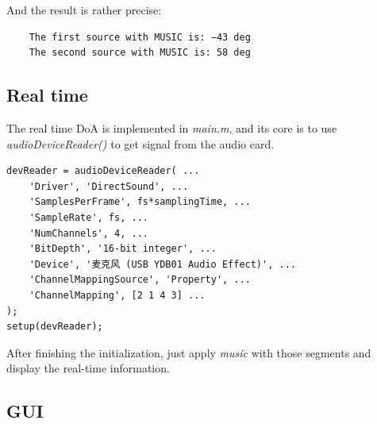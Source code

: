 \documentclass[UTF8]{article}
\begin{document}
\begin{figure}[H]
    \centering
    \hspace{0.4in}
\end{figure}

And the result is rather precise:
\begin{lstlisting}
    The first source with MUSIC is: −43 deg
    The second source with MUSIC is: 58 deg
\end{lstlisting}

\subsection{Real time}
The real time DoA is implemented in \emph{main.m}, and its core is to use \emph{audioDeviceReader()} to get signal from the audio card.

\begin{lstlisting}
devReader = audioDeviceReader( ...
    'Driver', 'DirectSound', ...
    'SamplesPerFrame', fs*samplingTime, ...
    'SampleRate', fs, ...
    'NumChannels', 4, ...
    'BitDepth', '16-bit integer', ...
    'Device', '麦克风 (USB YDB01 Audio Effect)', ...
    'ChannelMappingSource', 'Property', ...
    'ChannelMapping', [2 1 4 3] ...
);
setup(devReader);
\end{lstlisting}
After finishing the initialization, just apply \emph{music} with those segments and display the real-time information.

\subsection{GUI}
\end{document}
